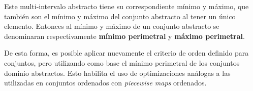 Este multi-intervalo abstracto tiene su correspondiente mínimo y máximo, que también son el mínimo y máximo del conjunto abstracto al tener un único elemento. Entonces al mínimo y máximo de un conjunto abstracto se denominaran respectivamente \textbf{mínimo perimetral} y \textbf{máximo perimetral}.  

De esta forma, es posible aplicar nuevamente el criterio de orden definido para conjuntos, pero utilizando como base el mínimo perimetral de los conjuntos dominio abstractos. Esto habilita el uso de optimizaciones análogas a las utilizadas en conjuntos ordenados con \textit{piecewise maps} ordenados.